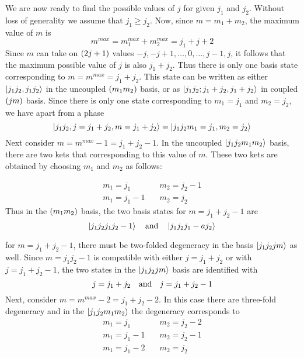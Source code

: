 We are now ready to find the possible values of $j$ for given $j_1$ and $j_2$. Without loss of generality we assume that $j_1 \geq j_2$. Now, since $m= m _1 + m_2$, the maximum value of $m$ is
\begin{equation}
m^{max} = m_1^{max} + m_2^{max} = j_1 + j +2
\end{equation} 
Since $m$ can take on $\qty(2 j + 1)$ values $-j, -j+1, \ldots, 0, \ldots, j-1, j$, it follows that the maximum possible value of $j$ is also $j_1+j_2$. Thus there is only one basis state corresponding to $m=m^{max}=j_1 + j_2$. This state can be written as either $\ket{j_1 j_2, j_1 j_2}$ in the uncoupled $\qty(m_1 m_2)$ basis, or as $\ket{j_1 j_2; j_1+j_2, j_1+j_2}$ in coupled $\qty(j m)$ basis. Since there is only one state corresponding to $m_1 = j_1$ and $m_2 = j_2$, we have apart from a phase
\begin{equation}
\ket{j_1 j_2, j=j_1+j_2, m=j_1+j_2} = \ket{j_1 j_2 m_1=j_1, m_2=j_2}
\end{equation}
Next consider $m=m^{max}-1 = j_1 + j_2 - 1$. In the uncoupled $\ket{j_1 j_2 m_1 m_2}$ basis, there are two kets that corresponding to this value of $m$. These two kets are obtained by choosing $m_1$ and $m_2$ as follows:

\begin{align*}
m_1 = j_1 &\quad m_2 = j_2 - 1 \\
m_1 = j_1 - 1 &\quad m_2 = j_2
\end{align*}
Thus in the $\qty(m_1 m_2)$ basis, the two basis states for $m=j_1 + j_2 - 1$ are
\begin{equation*}
\ket{j_1 j_2 j_1 j_2-1} \qq{and} \ket{j_1 j_2 j_1-a j_2}
\end{equation*}

for $m=j_1 + j_2 - 1$, there must be two-folded degeneracy in the basis $\ket{j_1 j_2 j m}$ as well. Since $m=j_1 j _ 2 - 1$ is compatible with either $j=j_1 + j _2$ or with $j=j_1 + j_2 - 1$, the two states in the $\ket{j_1 j_2 j m}$ basis are identified with
\begin{equation*}
j = j_1 + j_2 \qq{and} j=j_1 + j_2 - 1
\end{equation*}
Next, consider $m=m^{max} - 2 = j_1 + j_2 - 2$. In this case there are three-fold degeneracy and in the $\ket{j_1 j_2 m_1 m_2}$ the degeneracy corresponds to
\begin{align*}
m_1 = j_1 &\quad m_2 = j_2 - 2 \\
m_1 = j_1 - 1 &\quad m_2 = j_2 - 1 \\
m_1 = j_1 - 2 &\quad m_2 = j_2 
\end{align*}

